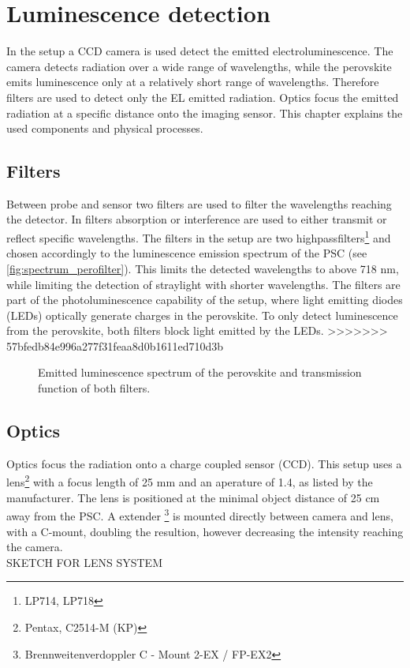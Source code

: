 \section{Luminescence detection}\label{sec:luminescencedetection}
In the setup a CCD camera is used detect the emitted electroluminescence. The camera detects radiation over a wide range of wavelengths, while the perovskite emits luminescence only at a relatively short range of wavelengths. Therefore filters are used to detect only the EL emitted radiation. Optics focus the emitted radiation at a specific distance onto the imaging sensor. This chapter explains the used components and physical processes.
\subsection{Filters}
Between probe and sensor two filters are used to filter the wavelengths reaching the detector. In filters absorption or interference are used to either transmit or reflect specific wavelengths. The filters in the setup are two highpassfilters\footnote{LP714, LP718} and chosen accordingly to the luminescence emission spectrum of the PSC (see \autoref{fig:spectrum_perofilter}). This limits the detected wavelengths to above 718 nm, while limiting the detection of straylight with shorter wavelengths. The filters are part of the photoluminescence capability of the setup, where light emitting diodes (LEDs) optically generate charges in the perovskite. To only detect luminescence from the perovskite, both filters block light emitted by the LEDs.
>>>>>>> 57bfedb84e996a277f31feaa8d0b1611ed710d3b

\begin{figure}[h]
	\centering
	
	\caption{Emitted luminescence spectrum of the perovskite and transmission function of both filters. }
	\label{fig:spectrum_perofilter}
\end{figure}
\subsection{Optics}
Optics focus the radiation onto a charge coupled sensor (CCD). This setup uses a lens\footnote{Pentax, C2514-M (KP)} with a focus length of 25 mm and an aperature of 1.4, as listed by the manufacturer. The lens is positioned at the minimal object distance of  25 cm away from the PSC. A extender \footnote{Brennweitenverdoppler C - Mount 2-EX / FP-EX2} is mounted directly between camera and lens, with a C-mount, doubling the resultion, however decreasing the intensity reaching the camera.
\\
SKETCH FOR LENS SYSTEM
\\


